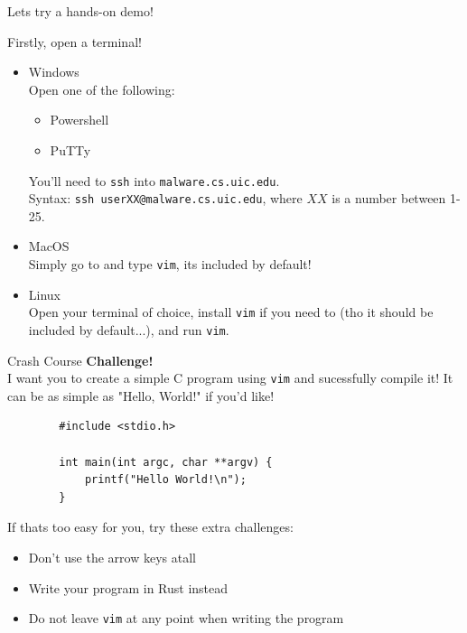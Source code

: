 \documentclass{beamer}
\begin{document}
\begin{frame}
	Lets try a hands-on demo!
	\pause

	Firstly, open a terminal!
	\begin{itemize}
		\item Windows\\
			Open one of the following:
			\begin{itemize}
				\item Powershell
				\item PuTTy
			\end{itemize}
			You'll need to \texttt{ssh} into
			\texttt{malware.cs.uic.edu}.\\
			Syntax: \texttt{ssh userXX@malware.cs.uic.edu}, where
			$XX$ is a number between 1-25.
		\item MacOS\\
			Simply go to  and
			type \texttt{vim}, its included by default!
		\item Linux\\
			Open your terminal of choice, install \texttt{vim} if
			you need to (tho it should be included by default...),
			and run \texttt{vim}.
	\end{itemize}
\end{frame}

\begin{frame}[fragile]{Crash Course}
	\textbf{Challenge!}\\
	I want you to create a simple C program using \texttt{vim} and
	sucessfully compile it! It can be as simple as "Hello, World!" if you'd
	like!

	\begin{verbatim}
		#include <stdio.h>

		int main(int argc, char **argv) {
			printf("Hello World!\n");
		}
	\end{verbatim}

	If thats too easy for you, try these extra challenges:
	\begin{itemize}
		\item Don't use the arrow keys atall
		\item Write your program in Rust instead
		\item Do not leave \texttt{vim} at any point when writing the
			program
	\end{itemize}
\end{frame}
\end{document}
